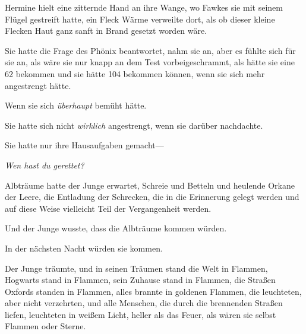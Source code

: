 Hermine hielt eine zitternde Hand an ihre Wange, wo Fawkes sie mit seinem Flügel gestreift hatte, ein Fleck Wärme verweilte dort, als ob dieser kleine Flecken Haut ganz sanft in Brand gesetzt worden wäre.

Sie hatte die Frage des Phönix beantwortet, nahm sie an, aber es fühlte sich für sie an, als wäre sie nur knapp an dem Test vorbeigeschrammt, als hätte sie eine 62 bekommen und sie hätte 104 bekommen können, wenn sie sich mehr angestrengt hätte.

Wenn sie sich \emph{überhaupt} bemüht hätte.

Sie hatte sich nicht \emph{wirklich} angestrengt, wenn sie darüber nachdachte.

Sie hatte nur ihre Hausaufgaben gemacht—

\emph{Wen hast du gerettet?}


Albträume hatte der Junge erwartet, Schreie und Betteln und heulende Orkane der Leere, die Entladung der Schrecken, die in die Erinnerung gelegt werden und auf diese Weise vielleicht Teil der Vergangenheit werden.

Und der Junge wusste, dass die Albträume kommen würden.

In der nächsten Nacht würden sie kommen.

Der Junge träumte, und in seinen Träumen stand die Welt in Flammen, Hogwarts stand in Flammen, sein Zuhause stand in Flammen, die Straßen Oxfords standen in Flammen, alles brannte in goldenen Flammen, die leuchteten, aber nicht verzehrten, und alle Menschen, die durch die brennenden Straßen liefen, leuchteten in weißem Licht, heller als das Feuer, als wären sie selbst Flammen oder Sterne.

